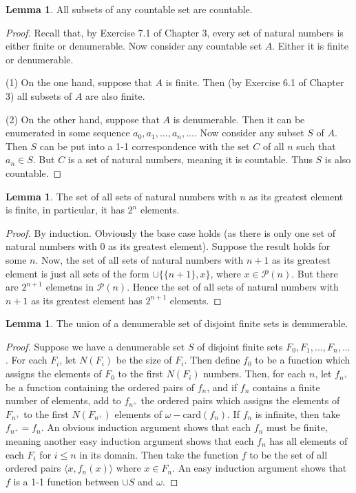 \documentclass{article}
\theoremstyle{definition}
\newtheorem{lemma}[theorem]{Lemma}
\begin{document}
\begin{lemma}
All subsets of any countable set are countable.
\end{lemma}
\begin{proof}
Recall that, by Exercise 7.1 of Chapter 3, every set of natural numbers is either finite or denumerable. Now 
consider any countable set $A$. Either it is finite or denumerable.

(1) On the one hand, suppose that $A$ is finite. Then (by Exercise 6.1 of Chapter 3) all subsets of $A$ are also
finite.

(2) On the other hand, suppose that $A$ is denumerable. Then it can be enumerated in some 
sequence $a_0,a_1,...,a_n,...$. Now consider any subset $S$ of $A$. Then 
$S$ can be put into a 1-1 correspondence with the set $C$ of all $n$ such that 
$a_n\in S$. But $C$ is a set of natural numbers, meaning it is countable. Thus $S$ is also 
countable.
\end{proof}

\begin{lemma}
The set of all sets of natural numbers with $n$ as its greatest element is finite, in particular, it has 
$2^n$ elements.
\end{lemma}
\begin{proof}
By induction. Obviously the base case holds (as there is only one set of natural numbers with $0$ as its greatest element). 
Suppose the result holds for some $n$. 
Now, the set of all sets of 
natural numbers with $n+1$ as its greatest element is just all sets of the form $\cup\{\{n+1\},x\}$, where $x\in\mathcal{P}(n)$. But 
there are $2^{n+1}$ elemetns in $\mathcal{P}(n)$. Hence the set of all sets of natural numbers with $n+1$ as its greatest element 
has $2^{n+1}$ elements.
\end{proof}

\begin{lemma}
The union of a denumerable set of disjoint finite sets is denumerable.
\end{lemma}
\begin{proof}
Suppose we have a denumerable set $S$ of disjoint finite sets $F_0,F_1,...,F_n,...$. For each $F_i$, let 
$N(F_i)$ be the size of $F_i$. Then define $f_0$ to be a function which assigns the elements of 
$F_0$ to the first $N(F_i)$ numbers. Then, for each $n$, let $f_{n^+}$ be a function containing the ordered pairs of 
$f_n$, and if $f_n$ contains a finite number of elements, add to $f_{n^+}$ the ordered pairs which assigns the elements of 
$F_{n^+}$ to the first $N(F_{n^+})$ elements of $\omega-\textrm{card}(f_n)$. If $f_n$ is infinite, then 
take $f_{n^+}=f_n$. An obvious induction argument shows that each $f_n$ must be finite, meaning another easy 
induction argument shows that each $f_n$ has all elements of each $F_i$ for $i\le n$ in its domain. Then take the function 
$f$ to be the set of all ordered pairs $\langle x,f_n(x)\rangle$ where $x\in F_n$. An easy induction argument shows that 
$f$ is a 1-1 function between $\cup S$ and $\omega$.
\end{proof}
\end{document}
